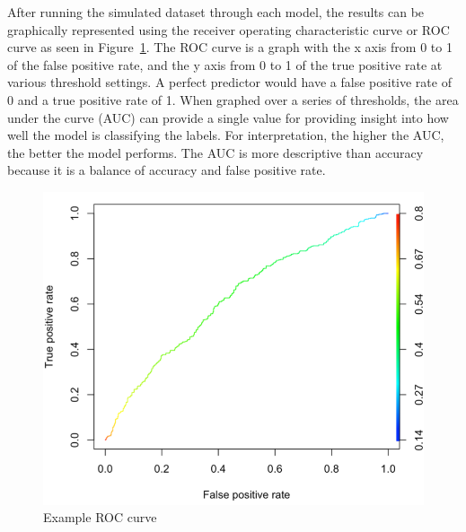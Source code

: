 \documentclass{llncs}
\begin{document}
\noindent 
After running the simulated dataset through each model, the results can be graphically represented using the receiver operating characteristic curve or ROC curve as seen in Figure~\ref{fig:roc}.  The ROC curve is a graph with the x axis from 0 to 1 of the false positive rate, and the y axis from 0 to 1 of the true positive rate at various threshold settings.  A perfect predictor would have a false positive rate of 0 and a true positive rate of 1.  When graphed over a series of thresholds, the area under the curve (AUC) can provide a single value for providing insight into how well the model is classifying the labels. For interpretation, the higher the AUC, the better the model performs. The AUC is more descriptive than accuracy because it is a balance of accuracy and false positive rate.
\begin{figure}
\centering
\includegraphics[scale=0.99]{roc.png}
\caption{Example ROC curve}
\label{fig:roc}
\end{figure}
\end{document}
